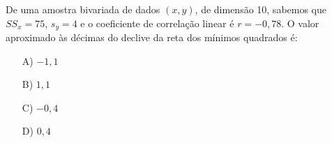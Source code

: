 De uma amostra bivariada de dados $(x,y)$, de dimensão 10, sabemos que $SS_x=75$, $s_y=4$ e o coeficiente de correlação linear é $r=-0,78$. O valor aproximado às décimas do declive da reta dos mínimos quadrados é:
\begin{enumerate}
\item [A)] $-1,1$
\item [B)] $1,1$
\item [C)] $-0,4$
\item [D)] $0,4$
\end{enumerate}
